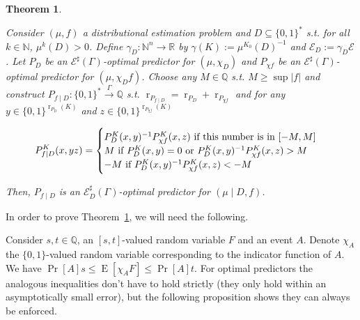 \documentclass{article}
\numberwithin{equation}{section}
\theoremstyle{definition}
\theoremstyle{plain}
\newtheorem{theorem}{Theorem}[section]
\newcommand{\Bool}{\{0,1\}}
\newcommand{\Words}{{\Bool^*}}
\DeclareMathOperator{\Prb}{Pr}
\DeclareMathOperator{\E}{E}
\DeclareMathOperator{\R}{r}
\newcommand{\Nats}{\mathbb{N}}
\newcommand{\Rats}{\mathbb{Q}}
\newcommand{\Reals}{\mathbb{R}}
\newcommand{\Abs}[1]{\lvert #1 \rvert}
\newcommand{\Fall}{\mathcal{E}}
\newcommand{\ESG}{\Fall^\sharp(\Gamma)}
\newcommand{\BoolR}[1]{\Bool^{\R_{#1}(K)}}
\newcommand{\Scheme}{\xrightarrow{\Gamma}}
\begin{document}
\begin{samepage}
\begin{theorem}
\label{thm:cond}

Consider $(\mu, f)$ a distributional estimation problem and ${D \subseteq \Words}$ s.t. for all $k \in \Nats$, $\mu^k(D) > 0$. Define $\gamma_D: \Nats^n \rightarrow \Reals$ by $\gamma(K):=\mu^{K_0}(D)^{-1}$ and $\Fall_D:=\gamma_D \Fall$. Let $P_D$ be an $\ESG$-optimal predictor for $(\mu, \chi_D)$ and $P_{\chi f}$ be an $\ESG$-optimal predictor for $(\mu, \chi_D f)$. Choose any $M \in \Rats$ s.t. ${M \geq \sup \Abs{f}}$ and construct $P_{f \mid D}: \Words \Scheme \Rats$ s.t. $\R_{P_{f \mid D}} = \R_{P_D} + \R_{P_{\chi f}}$ and for any ${y \in \BoolR{P_D}}$ and $z \in \BoolR{P_{\chi f}}$ 

\begin{equation}
P_{f \mid D}^K(x,yz)=\begin{cases}P_D^K(x,y)^{-1} P_{\chi f}^K(x,z) \textnormal{ if this number is in } [-M,M] \\ M \textnormal{ if } P_D^K(x,y)=0 \textnormal{ or } P_D^K(x,y)^{-1} P_{\chi f}^K(x,z) > M\\ -M \textnormal{ if } P_D^K(x,y)^{-1} P_{\chi f}^K(x,z) < -M\end{cases}
\end{equation}

Then, $P_{f \mid D}$ is an $\Fall_D^\sharp(\Gamma)$-optimal predictor for $(\mu \mid D, f)$.

\end{theorem}
\end{samepage}

In order to prove Theorem~\ref{thm:cond}, we will need the following.

Consider $s,t \in \Rats$, an $[s,t]$-valued random variable $F$ and an event $A$. Denote $\chi_A$ the $\Bool$-valued random variable corresponding to the indicator function of $A$. We have $\Prb[A]s \leq \E[\chi_A F] \leq \Prb[A]t$. For optimal predictors the analogous inequalities don't have to hold strictly (they only hold within an asymptotically small error), but the following proposition shows they can always be enforced.
\end{document}
